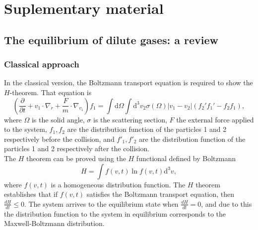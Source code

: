 \documentclass{article}
\begin{document}
\section{Suplementary material}
\subsection{The equilibrium of dilute gases: a review}
\subsubsection{Classical approach}
In the classical version, the Boltzmann transport equation is required to show the $H$-theorem. That equation is
\begin{equation}
    \left( \frac{\partial }{\partial t}+v_1 \cdot \nabla_r +\frac{F}{m} \cdot \nabla_{v_1} \right)f_1=\int \mathrm{d}\Omega \int \mathrm{d}^{3}v_2\sigma(\Omega)|v_1-v_2|(f_2'f_1'-f_2f_1),
\end{equation}
where $\Omega$ is the solid angle, $\sigma$ is the scattering section, $F$ the external force applied to the system, $f_1, f_2$ are the distribution function of the particles 1 and 2 respectively before the collision, and $f'_1, f'_2$ are the distribution function of the particles 1 and 2 respectively after the collision.\\
The $H$ theorem can be proved using the $H$ functional defined by Boltzmann 
\begin{equation}
    H=\int f(v,t) \ln f(v,t) \mathrm{d}^{3}v,\label{hfunctional}
\end{equation} 
where $f(v,t)$ is a homogeneous distribution function. The $H$ theorem establishes that if $f(v,t)$ satisfies the Boltzmann transport equation, then $\frac{dH}{dt}\leq 0$. The system arrives to the equilibrium state when $\frac{dH}{dt}=0$, and due to this the distribution function to the system in equilibrium corresponds to the Maxwell-Boltzmann distribution.
\end{document}
